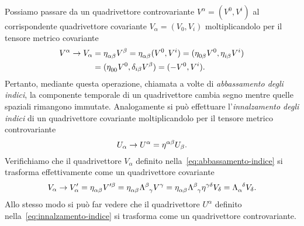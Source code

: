 Possiamo passare da un quadrivettore controvariante
$V^{\alpha} = (V^{0}, V^{i})$ al corrispondente quadrivettore covariante
$V_{\alpha} = (V_{0}, V_{i})$ moltiplicandolo per il tensore metrico covariante
\begin{equation}
  \label{eq:abbassamento-indice}
  \begin{split}
    V^{\alpha} \to V_{\alpha} &= \tensor{\eta}{_{\alpha\beta}}V^{\beta} =
    \tensor{\eta}{_{\alpha\beta}} (V^{0}, V^{i}) =
    (\tensor{\eta}{_{0\beta}}V^{0}, \tensor{\eta}{_{i\beta}}V^{i}) \\
    &= (\tensor{\eta}{_{00}}V^{0}, \delta_{i\beta}V^{\beta}) = (-V^{0}, V^{i}).
  \end{split}
\end{equation}
Pertanto, mediante questa operazione, chiamata a volte di
\emph{abbassamento degli indici}, la componente temporale di un quadrivettore
cambia segno mentre quelle spaziali rimangono immutate.  Analogamente si può
effettuare l'\emph{innalzamento degli indici} di un quadrivettore covariante
moltiplicandolo per il tensore metrico controvariante
\begin{equation}
  \label{eq:innalzamento-indice}
  U_{\alpha} \to U^{\alpha} = \tensor{\eta}{^{\alpha\beta}}U_{\beta}.
\end{equation}
Verifichiamo che il quadrivettore $V_{\alpha}$ definito
nella~\eqref{eq:abbassamento-indice} si trasforma effettivamente come un
quadrivettore covariante
\begin{equation}
  V_{\alpha} \to V'_{\alpha} = \tensor{\eta}{_{\alpha\beta}}V'^{\beta} =
  \tensor{\eta}{_{\alpha\beta}} \tensor{\Lambda}{^{\beta}_{\gamma}} V^{\gamma} =
  \tensor{\eta}{_{\alpha\beta}} \tensor{\Lambda}{^{\beta}_{\gamma}}
  \tensor{\eta}{^{\gamma\delta}}V_{\delta} =
  \tensor{\Lambda}{_{\alpha}^{\delta}} V_{\delta}.
\end{equation}
Allo stesso modo si può far vedere che il quadrivettore $U^{\alpha}$ definito
nella~\eqref{eq:innalzamento-indice} si trasforma come un quadrivettore
controvariante.

